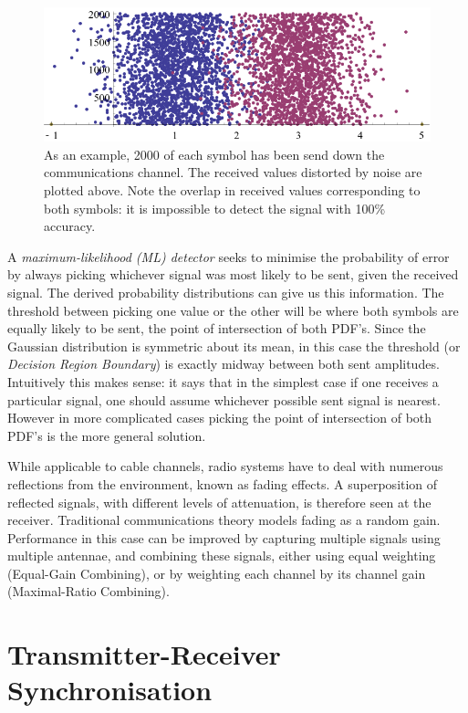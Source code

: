 \begin{figure}[htbp]
\centering
\includegraphics[width=\linewidth]{4-PAM_samples.png}
\caption[AWGN channel simulation]{As an example, 2000 of each symbol has been send down the communications channel. The received values distorted by noise are
plotted above. Note the overlap in received values corresponding to both
symbols: it is impossible to detect the signal with 100\% accuracy.}
\end{figure}

A \emph{maximum-likelihood (ML) detector} seeks to minimise the probability of
error by always picking whichever signal was most likely to be sent, given
the received signal. The derived probability distributions can give us this information. The threshold between picking one value or the other
will be where both symbols are equally likely to be sent, the point of
intersection of both PDF's. Since the Gaussian distribution is symmetric
about its mean, in this case the threshold (or \emph{Decision Region
Boundary}) is exactly midway between both sent amplitudes. Intuitively
this makes sense: it says that in the simplest case if one receives a particular
signal, one should assume whichever possible sent signal is nearest. However in more complicated cases picking the point of intersection of both PDF's
is the more general solution. 

While applicable to cable channels, radio systems have to deal with numerous reflections from the environment, known as fading effects. A superposition of reflected signals, with different levels of attenuation, is therefore seen at the receiver. Traditional communications theory models fading as a random gain. Performance in this case can be improved by capturing multiple signals using multiple antennae, and combining these signals, either using equal weighting (Equal-Gain Combining), or by weighting each channel by its channel gain (Maximal-Ratio Combining).

\section{Transmitter-Receiver Synchronisation}

